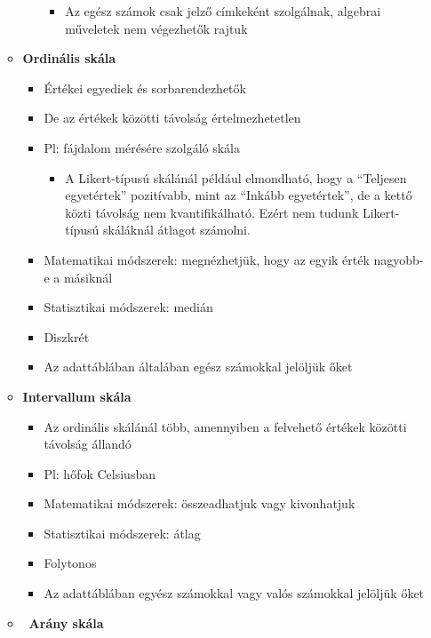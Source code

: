 \documentclass[
  letterpaper,
  DIV=11,
  numbers=noendperiod]{scrreprt}
\providecommand{\tightlist}{%
  \setlength{\itemsep}{0pt}\setlength{\parskip}{0pt}}\usepackage{longtable,booktabs,array}
\begin{document}
\begin{itemize}
\begin{itemize}
\begin{itemize}
      \begin{itemize}
      \tightlist
      \item
        Az egész számok csak jelző címkeként szolgálnak, algebrai
        műveletek nem végezhetők rajtuk
      \end{itemize}
    \end{itemize}
  \item
    \textbf{Ordinális skála}

    \begin{itemize}
    \item
      Értékei egyediek és sorbarendezhetők
    \item
      De az értékek közötti távolság értelmezhetetlen
    \item
      Pl: fájdalom mérésére szolgáló skála

      \begin{itemize}
      \tightlist
      \item
        A Likert-típusú skálánál például elmondható, hogy a ``Teljesen
        egyetértek'' pozitívabb, mint az ``Inkább egyetértek'', de a
        kettő közti távolság nem kvantifikálható. Ezért nem tudunk
        Likert-típusú skáláknál átlagot számolni.
      \end{itemize}
    \item
      Matematikai módszerek: megnézhetjük, hogy az egyik érték nagyobb-e
      a másiknál
    \item
      Statisztikai módszerek: medián
    \item
      Diszkrét
    \item
      Az adattáblában általában egész számokkal jelöljük őket
    \end{itemize}
  \item
    \textbf{Intervallum skála}

    \begin{itemize}
    \item
      Az ordinális skálánál több, amennyiben a felvehető értékek közötti
      távolság állandó
    \item
      Pl: hőfok Celsiusban
    \item
      Matematikai módszerek: összeadhatjuk vagy kivonhatjuk
    \item
      Statisztikai módszerek: átlag
    \item
      Folytonos
    \item
      Az adattáblában egyész számokkal vagy valós számokkal jelöljük
      őket
    \end{itemize}
  \item
    ~\textbf{Arány skála}


\end{itemize}
\end{itemize}
\end{document}
